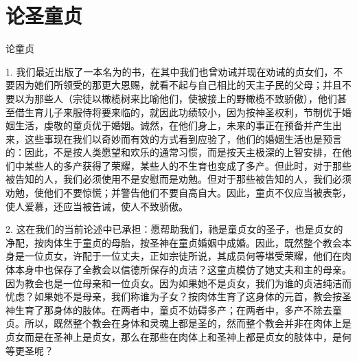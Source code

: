 
\chapter{论圣童贞}


论童贞\par

\par

1. 我们最近出版了一本名为的书，在其中我们也曾劝诫并现在劝诫的贞女们，不要因为她们所领受的那更大恩赐，就看不起与自己相比的天主子民的父母；并且不要以为那些人（宗徒以橄榄树来比喻他们，使被接上的野橄榄不致骄傲），他们甚至借生育儿子来服侍将要来临的，就因此功绩较小，因为按神圣权利，节制优于婚姻生活，虔敬的童贞优于婚姻。诚然，在他们身上，未来的事正在预备并产生出来，这些事现在我们以奇妙而有效的方式看到应验了，他们的婚姻生活也是预言的：因此，不是按人类愿望和欢乐的通常习惯，而是按天主极深的上智安排，在他们中某些人的多产获得了荣耀，某些人的不生育也变成了多产。但此时，对于那些被告知的人，我们必须使用不是安慰而是劝勉。但对于那些被告知的人，我们必须劝勉，使他们不要惊慌；并警告他们不要自高自大。因此，童贞不仅应当被表彰，使人爱慕，还应当被告诫，使人不致骄傲。\par

2. 这在我们的当前论述中已承担：愿帮助我们，祂是童贞女的圣子，也是贞女的净配，按肉体生于童贞的母胎，按圣神在童贞婚姻中成婚。因此，既然整个教会本身是一位贞女，许配于一位丈夫，正如宗徒所说，其成员何等堪受荣耀，他们在肉体本身中也保存了全教会以信德所保存的贞洁？这童贞模仿了她丈夫和主的母亲。因为教会也是一位母亲和一位贞女。因为如果她不是贞女，我们为谁的贞洁纯洁而忧虑？如果她不是母亲，我们称谁为子女？按肉体生育了这身体的元首，教会按圣神生育了那身体的肢体。在两者中，童贞不妨碍多产；在两者中，多产不除去童贞。所以，既然整个教会在身体和灵魂上都是圣的，然而整个教会并非在肉体上是贞女而是在圣神上是贞女，那么在那些在肉体上和圣神上都是贞女的肢体中，是何等更圣呢？\par


